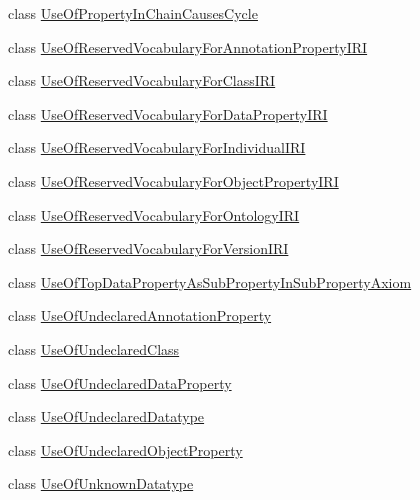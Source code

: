 \begin{DoxyCompactItemize}
\item 
class \hyperlink{classorg_1_1semanticweb_1_1owlapi_1_1profiles_1_1_use_of_property_in_chain_causes_cycle}{Use\-Of\-Property\-In\-Chain\-Causes\-Cycle}
\item 
class \hyperlink{classorg_1_1semanticweb_1_1owlapi_1_1profiles_1_1_use_of_reserved_vocabulary_for_annotation_property_i_r_i}{Use\-Of\-Reserved\-Vocabulary\-For\-Annotation\-Property\-I\-R\-I}
\item 
class \hyperlink{classorg_1_1semanticweb_1_1owlapi_1_1profiles_1_1_use_of_reserved_vocabulary_for_class_i_r_i}{Use\-Of\-Reserved\-Vocabulary\-For\-Class\-I\-R\-I}
\item 
class \hyperlink{classorg_1_1semanticweb_1_1owlapi_1_1profiles_1_1_use_of_reserved_vocabulary_for_data_property_i_r_i}{Use\-Of\-Reserved\-Vocabulary\-For\-Data\-Property\-I\-R\-I}
\item 
class \hyperlink{classorg_1_1semanticweb_1_1owlapi_1_1profiles_1_1_use_of_reserved_vocabulary_for_individual_i_r_i}{Use\-Of\-Reserved\-Vocabulary\-For\-Individual\-I\-R\-I}
\item 
class \hyperlink{classorg_1_1semanticweb_1_1owlapi_1_1profiles_1_1_use_of_reserved_vocabulary_for_object_property_i_r_i}{Use\-Of\-Reserved\-Vocabulary\-For\-Object\-Property\-I\-R\-I}
\item 
class \hyperlink{classorg_1_1semanticweb_1_1owlapi_1_1profiles_1_1_use_of_reserved_vocabulary_for_ontology_i_r_i}{Use\-Of\-Reserved\-Vocabulary\-For\-Ontology\-I\-R\-I}
\item 
class \hyperlink{classorg_1_1semanticweb_1_1owlapi_1_1profiles_1_1_use_of_reserved_vocabulary_for_version_i_r_i}{Use\-Of\-Reserved\-Vocabulary\-For\-Version\-I\-R\-I}
\item 
class \hyperlink{classorg_1_1semanticweb_1_1owlapi_1_1profiles_1_1_use_of_top_data_property_as_sub_property_in_sub_property_axiom}{Use\-Of\-Top\-Data\-Property\-As\-Sub\-Property\-In\-Sub\-Property\-Axiom}
\item 
class \hyperlink{classorg_1_1semanticweb_1_1owlapi_1_1profiles_1_1_use_of_undeclared_annotation_property}{Use\-Of\-Undeclared\-Annotation\-Property}
\item 
class \hyperlink{classorg_1_1semanticweb_1_1owlapi_1_1profiles_1_1_use_of_undeclared_class}{Use\-Of\-Undeclared\-Class}
\item 
class \hyperlink{classorg_1_1semanticweb_1_1owlapi_1_1profiles_1_1_use_of_undeclared_data_property}{Use\-Of\-Undeclared\-Data\-Property}
\item 
class \hyperlink{classorg_1_1semanticweb_1_1owlapi_1_1profiles_1_1_use_of_undeclared_datatype}{Use\-Of\-Undeclared\-Datatype}
\item 
class \hyperlink{classorg_1_1semanticweb_1_1owlapi_1_1profiles_1_1_use_of_undeclared_object_property}{Use\-Of\-Undeclared\-Object\-Property}
\item 
class \hyperlink{classorg_1_1semanticweb_1_1owlapi_1_1profiles_1_1_use_of_unknown_datatype}{Use\-Of\-Unknown\-Datatype}
\end{DoxyCompactItemize}
